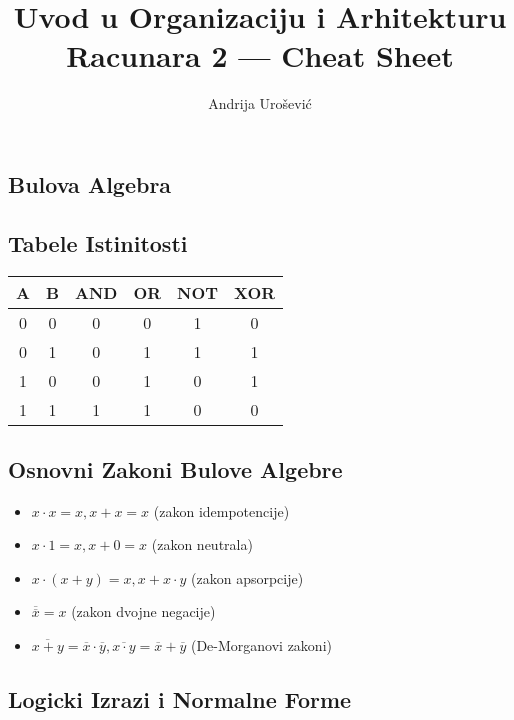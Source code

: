 \documentclass[12p, a4paper]{article}
\title{Uvod u Organizaciju i Arhitekturu Racunara 2 --- Cheat Sheet}
\author{Andrija Urošević}
\begin{document}
\maketitle

\begin{multicols}{2}

\section{Bulova Algebra}

    \subsection{Tabele Istinitosti}

    \begin{tabular}{*{6}{c}}
        A & B & AND & OR & NOT & XOR \\
        \midrule
        0 & 0 & 0 & 0 & 1 & 0 \\
        0 & 1 & 0 & 1 & 1 & 1 \\
        1 & 0 & 0 & 1 & 0 & 1 \\
        1 & 1 & 1 & 1 & 0 & 0 \\
    \end{tabular}

    \subsection{Osnovni Zakoni Bulove Algebre}

    \begin{itemize}
        \itemsep0em
        \item $x \cdot x = x, x + x = x$ (zakon idempotencije)
        \item $x \cdot 1 = x, x + 0 = x$ (zakon neutrala)
        \item $x \cdot (x + y) = x, x + x \cdot y$ (zakon apsorpcije)
        \item $\overline{\overline{x}} = x$ (zakon dvojne negacije)
        \item $\overline{x + y} = \overline{x} \cdot \overline{y},
            \overline{x \cdot y} = \overline{x} + \overline{y}$
            (De-Morganovi zakoni)
    \end{itemize}

    \subsection{Logicki Izrazi i Normalne Forme}


\end{multicols}
\end{document}
